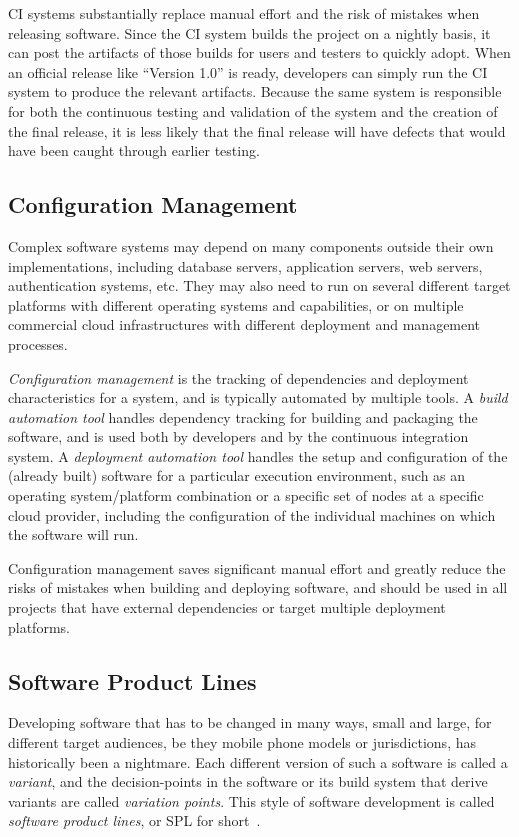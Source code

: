 CI systems substantially replace manual effort and the risk of
mistakes when releasing software. Since the CI system builds the
project on a nightly basis, it can post the artifacts of those builds
for users and testers to quickly adopt. When an official release like
``Version 1.0'' is ready, developers can simply run the CI system to
produce the relevant artifacts. Because the same system is responsible
for both the continuous testing and validation of the system and the
creation of the final release, it is less likely that the final
release will have defects that would have been caught through earlier
testing.

\subsection{Configuration Management}

Complex software systems may depend on many components outside their
own implementations, including database servers, application servers,
web servers, authentication systems, etc. They may also need to run on
several different target platforms with different operating systems
and capabilities, or on multiple commercial cloud infrastructures with
different deployment and management processes.

\emph{Configuration management} is the tracking of dependencies and
deployment characteristics for a system, and is typically automated by
multiple tools. A \emph{build automation tool} handles dependency
tracking for building and packaging the software, and is used both by
developers and by the continuous integration system. A
\emph{deployment automation tool} handles the setup and configuration
of the (already built) software for a particular execution
environment, such as an operating system/platform combination or a
specific set of nodes at a specific cloud provider, including the
configuration of the individual machines on which the software will
run.

Configuration management saves significant manual effort and greatly
reduce the risks of mistakes when building and deploying software, and
should be used in all projects that have external dependencies or
target multiple deployment platforms.

\subsection{Software Product Lines}

Developing software that has to be changed in many ways, small and
large, for different target audiences, be they mobile phone models or
jurisdictions, has historically been a nightmare.  Each different
version of such a software is called a \emph{variant}, and the
decision-points in the software or its build system that derive
variants are called \emph{variation points}. This style of software
development is called \emph{software product lines}, or SPL for
short~\cite{czarnecki2005model,northrop2001software,clements2002software}.

